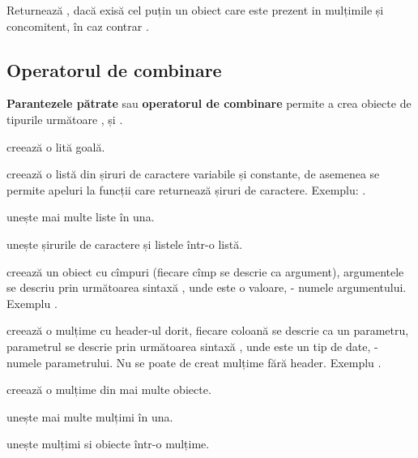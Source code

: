 Returnează \true, dacă exisă cel puțin un obiect care este prezent in mulțimile  și  concomitent, în caz contrar \false.

\subsection{Operatorul de combinare}

{\bf Parantezele pătrate} sau {\bf operatorul de combinare} permite a crea obiecte de tipurile următoare \listtype{}, \set{} și \object{}.

 creează o lită goală.

 creează o listă din șiruri de caractere variabile și constante, de asemenea se permite apeluri la funcții care returnează șiruri de caractere. Exemplu: \code{["a", "b", "c"]}.

 unește mai multe liste în una.

 unește șirurile de caractere și listele într-o listă.

 creează un obiect cu cîmpuri (fiecare cîmp se descrie ca argument), argumentele se descriu prin următoarea sintaxă , unde  este o valoare,  - numele argumentului. Exemplu \code{[number = 2, str = "str"]}.

 creează o mulțime cu header-ul dorit, fiecare coloană se descrie ca un parametru, parametrul se descrie prin următoarea sintaxă , unde  este un tip de date,  - numele parametrului. Nu se poate de creat mulțime fără header. Exemplu .

 creează o mulțime din mai multe obiecte.

 unește mai multe mulțimi în una.

 unește mulțimi si obiecte într-o mulțime.

